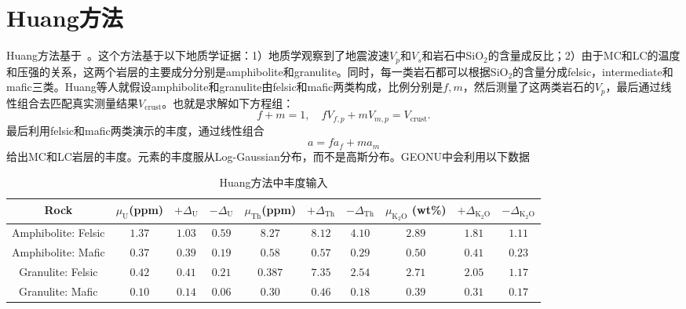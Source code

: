 		\section{Huang方法}
		\label{Geology: Huang Method}
			Huang方法基于~\cite{Huang2013}。这个方法基于以下地质学证据：1）地质学观察到了地震波速$V_p$和$V_s$和岩石中SiO$_2$的含量成反比；2）由于MC和LC的温度和压强的关系，这两个岩层的主要成分分别是amphibolite和granulite。同时，每一类岩石都可以根据SiO$_2$的含量分成felsic，intermediate和mafic三类。Huang等人就假设amphibolite和granulite由felsic和mafic两类构成，比例分别是$f,m$，然后测量了这两类岩石的$V_p$，最后通过线性组合去匹配真实测量结果$V_\mathrm{crust}$。也就是求解如下方程组：
				\begin{equation}
					f + m = 1,
					\quad
					fV_{f, p} + mV_{m, p}
					= V_\mathrm{crust}.
				\end{equation}
			最后利用felsic和mafic两类演示的丰度，通过线性组合
				\begin{equation}
					a = fa_f + ma_m
				\end{equation}
			给出MC和LC岩层的丰度。元素的丰度服从Log-Gaussian分布，而不是高斯分布。GEONU中会利用以下数据
				\begin{table}[H]
					\centering
					\caption{Huang方法中丰度输入}
					\begin{tabular}{c|c|c|c|c|c|c|c|c|c}
						\hline
						\hline
						Rock & $\mu_\mathrm{U}$(ppm) & $+\Delta_\mathrm{U}$ & $-\Delta_\mathrm{U}$ & $\mu_\mathrm{Th}$(ppm) & $+\Delta_\mathrm{Th}$ & $-\Delta_\mathrm{Th}$ & $\mu_\mathrm{K_2O}$ (wt\%)& $+\Delta_\mathrm{K_2O}$ & $-\Delta_\mathrm{K_2O}$\\
						\hline
						Amphibolite: Felsic & $1.37$ & $1.03$ & $0.59$ & $8.27$ & $8.12$ & $4.10$ & $2.89$ & $1.81$ & $1.11$\\
						\hline
						Amphibolite: Mafic & $0.37$ & $0.39$ & $0.19$ & $0.58$ & $0.57$ & $0.29$ & $0.50$ & $0.41$ & $0.23$\\
						\hline
						Granulite: Felsic & $0.42$ & $0.41$ & $0.21$ & $0.387$ & $7.35$ & $2.54$ & $2.71$ & $2.05$ & $1.17$\\
						\hline
						Granulite: Mafic & $0.10$ & $0.14$ & $0.06$ & $0.30$ & $0.46$ & $0.18$ & $0.39$ & $0.31$ & $0.17$\\
						\hline
						\hline
					\end{tabular}
				\end{table}
